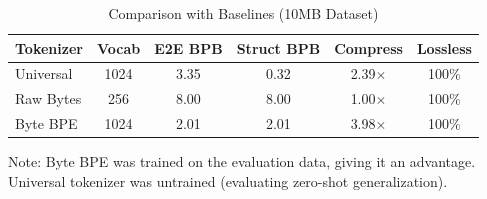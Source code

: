 \begin{table}[h]
\centering
\caption{Comparison with Baselines (10MB Dataset)}
\label{tab:baselines}
\begin{tabular}{lccccc}
\toprule
Tokenizer & Vocab & E2E BPB & Struct BPB & Compress & Lossless \\
\midrule
Universal     & 1024  & 3.35 & 0.32 & 2.39$\times$ & 100\% \\
Raw Bytes     & 256   & 8.00 & 8.00 & 1.00$\times$ & 100\% \\
Byte BPE      & 1024  & 2.01 & 2.01 & 3.98$\times$ & 100\% \\
\bottomrule
\end{tabular}

\vspace{0.5em}
\footnotesize{Note: Byte BPE was trained on the evaluation data, giving it an advantage.
Universal tokenizer was untrained (evaluating zero-shot generalization).}
\end{table}
